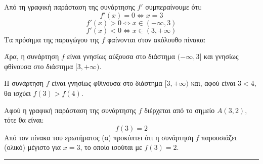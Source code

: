 \begin{alist}
\item Από τη γραφική παράσταση της συνάρτησης $f'$ συμπεραίνουμε ότι:
\[ f'(x) = 0 \Leftrightarrow x = 3 \]
\[ f'(x) > 0 \Leftrightarrow x \in (-\infty, 3) \]
\[ f'(x) < 0 \Leftrightarrow x \in (3, +\infty) \]
Τα πρόσημα της παραγώγου της $f$ φαίνονται στον ακόλουθο πίνακα:

\begin{center}
\end{center}

Άρα, η συνάρτηση $f$ είναι γνησίως αύξουσα στο διάστημα $(-\infty, 3]$ και γνησίως φθίνουσα στο διάστημα $[3, +\infty)$.
\item Η συνάρτηση $f$ είναι γνησίως φθίνουσα στο διάστημα $[3, +\infty)$ και, αφού είναι $3 < 4$, θα ισχύει $f(3) > f(4)$.
\item Αφού η γραφική παράσταση της συνάρτησης $f$ διέρχεται από το σημείο $A(3,2)$, τότε θα είναι:
\[ f(3) = 2 \]
Από τον πίνακα του ερωτήματος (α) προκύπτει ότι η συνάρτηση $f$ παρουσιάζει (ολικό) μέγιστο για $x = 3$, το οποίο ισούται με $f(3) = 2$.
\end{alist}
\vspace{6mm}
\noindent\rule{\textwidth}{0.4pt}
\vspace{6mm}

